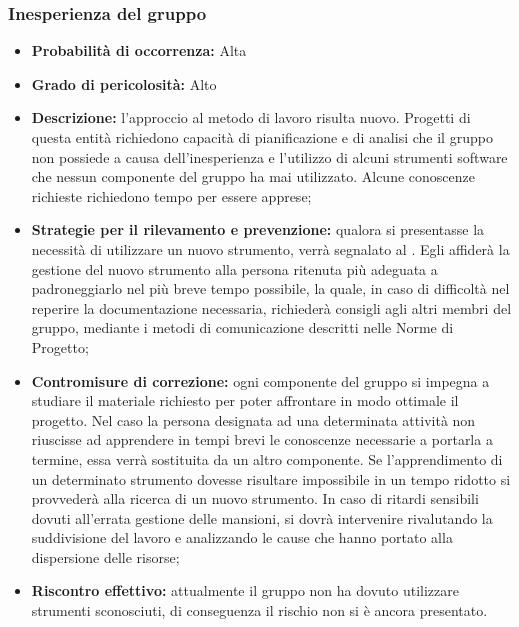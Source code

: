 \subsubsection{Inesperienza del gruppo}
\hypertarget{subsubsect:inesperienza}{}
\begin{itemize}
\item \textbf{Probabilità di occorrenza:} Alta
\item \textbf{Grado di pericolosità:} Alto

\item \textbf{Descrizione:} l'approccio al metodo di lavoro risulta nuovo. Progetti di questa entità richiedono capacità di pianificazione e di analisi che il gruppo non possiede a causa dell'inesperienza e l'utilizzo di alcuni strumenti software che nessun componente del gruppo ha mai utilizzato. Alcune conoscenze richieste richiedono tempo per essere apprese;

\item \textbf{Strategie per il rilevamento e prevenzione:} qualora si presentasse la necessità di utilizzare un nuovo strumento, verrà segnalato al \ruoloResponsabile. Egli affiderà la gestione del nuovo strumento alla persona ritenuta più adeguata a padroneggiarlo nel più breve tempo possibile, la quale, in caso di difficoltà nel reperire la documentazione necessaria, richiederà consigli agli altri membri del gruppo, mediante i metodi di comunicazione descritti nelle Norme di Progetto; 

\item \textbf{Contromisure di correzione:} ogni componente del gruppo si impegna a studiare il materiale richiesto per poter affrontare in modo ottimale il progetto. Nel caso la persona designata ad una determinata attività non riuscisse ad apprendere in tempi brevi le conoscenze necessarie a portarla a termine, essa verrà sostituita da un altro componente. Se l'apprendimento di un determinato strumento dovesse risultare impossibile in un tempo ridotto si provvederà alla ricerca di un nuovo strumento. In caso di ritardi sensibili dovuti all'errata gestione delle mansioni, si dovrà intervenire rivalutando la suddivisione
del lavoro e analizzando le cause che hanno portato alla dispersione delle risorse;

\item \textbf{Riscontro effettivo:} attualmente il gruppo non ha dovuto utilizzare strumenti sconosciuti, di conseguenza il rischio non si è ancora presentato.
\end{itemize}


